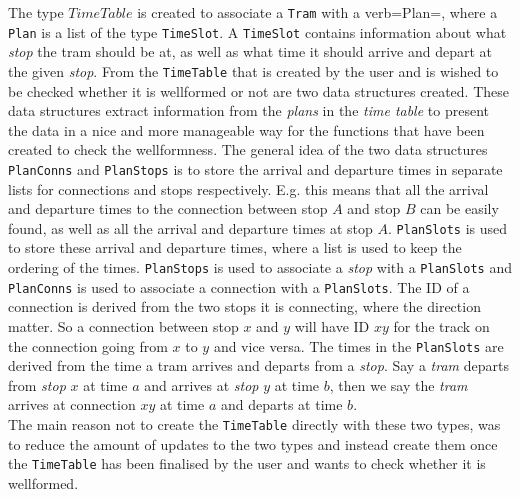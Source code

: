 \documentclass[a4]{article}
\begin{document}
The type $TimeTable$ is created to associate a \verb=Tram= with a verb=Plan=, where a \verb=Plan= is a list of the type \verb=TimeSlot=. A \verb=TimeSlot= contains information about what \emph{stop} the tram should be at, as well as what time it should arrive and depart at the given \emph{stop}.
From the \verb=TimeTable= that is created by the user and is wished to be checked whether it is wellformed or not are two data structures created. These data structures extract information from the \emph{plans} in the \emph{time table} to present the data in a nice and more manageable way for the functions that have been created to check the wellformness. The general idea of the two data structures \verb=PlanConns= and \verb=PlanStops= is to store the arrival and departure times in separate lists for connections and stops respectively. E.g. this means that all the arrival and departure times to the connection between stop $A$ and stop $B$ can be easily found, as well as all the arrival and departure times at stop $A$. \verb=PlanSlots= is used to store these arrival and departure times, where a list is used to keep the ordering of the times. \verb=PlanStops= is used to associate a \emph{stop} with a \verb=PlanSlots= and \verb=PlanConns= is used to associate a connection with a \verb=PlanSlots=. The ID of a connection is derived from the two stops it is connecting, where the direction matter. So a connection between stop $x$ and $y$ will have ID $xy$ for the track on the connection going from $x$ to $y$ and vice versa. The times in the \verb=PlanSlots= are derived from the time a tram arrives and departs from a \emph{stop}. Say a \emph{tram} departs from \emph{stop} $x$ at time $a$ and arrives at \emph{stop} $y$ at time $b$, then we say the \emph{tram} arrives at connection $xy$ at time $a$ and departs at time $b$. \\

The main reason not to create the \verb=TimeTable= directly with these two types, was to reduce the amount of updates to the two types and instead create them once the \verb=TimeTable= has been finalised by the user and wants to check whether it is wellformed.
\\
\end{document}
